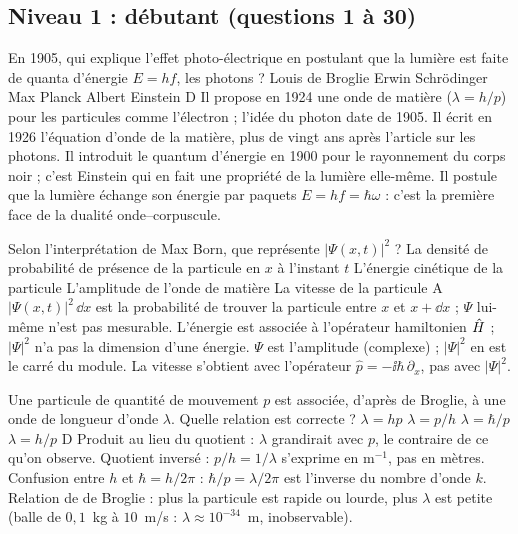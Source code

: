 \clearpage
\subsection{Niveau 1 : débutant (questions 1 à 30)}\label{sec:qcm-n1}
\par\smallskip
  {En 1905, qui explique l'effet photo-électrique en postulant que la lumière est faite de quanta d'énergie $E=hf$, les photons ?}
  {Louis de Broglie}
  {Erwin Schrödinger}
  {Max Planck}
  {Albert Einstein}
  {D}
\qcmx
  {Il propose en 1924 une onde de matière ($\lambda=h/p$) pour les particules comme l'électron ; l'idée du photon date de 1905.}
  {Il écrit en 1926 l'équation d'onde de la matière, plus de vingt ans après l'article sur les photons.}
  {Il introduit le quantum d'énergie en 1900 pour le rayonnement du corps noir ; c'est Einstein qui en fait une propriété de la lumière elle-même.}
  {Il postule que la lumière échange son énergie par paquets $E=hf=\hbar\omega$ : c'est la première face de la dualité onde--corpuscule.}

  {Selon l'interprétation de Max Born, que représente $|\Psi(x,t)|^2$ ?}
  {La densité de probabilité de présence de la particule en $x$ à l'instant $t$}
  {L'énergie cinétique de la particule}
  {L'amplitude de l'onde de matière}
  {La vitesse de la particule}
  {A}
\qcmx
  {$|\Psi(x,t)|^2\,\dd x$ est la probabilité de trouver la particule entre $x$ et $x+\dd x$ ; $\Psi$ lui-même n'est pas mesurable.}
  {L'énergie est associée à l'opérateur hamiltonien $\hat{H}$ ; $|\Psi|^2$ n'a pas la dimension d'une énergie.}
  {$\Psi$ est l'amplitude (complexe) ; $|\Psi|^2$ en est le carré du module.}
  {La vitesse s'obtient avec l'opérateur $\hat p=-\ii\hbar\,\partial_x$, pas avec $|\Psi|^2$.}

  {Une particule de quantité de mouvement $p$ est associée, d'après de Broglie, à une onde de longueur d'onde $\lambda$. Quelle relation est correcte ?}
  {$\lambda=hp$}
  {$\lambda=p/h$}
  {$\lambda=\hbar/p$}
  {$\lambda=h/p$}
  {D}
\qcmx
  {Produit au lieu du quotient : $\lambda$ grandirait avec $p$, le contraire de ce qu'on observe.}
  {Quotient inversé : $p/h=1/\lambda$ s'exprime en m$^{-1}$, pas en mètres.}
  {Confusion entre $h$ et $\hbar=h/2\pi$ : $\hbar/p=\lambda/2\pi$ est l'inverse du nombre d'onde $k$.}
  {Relation de de Broglie : plus la particule est rapide ou lourde, plus $\lambda$ est petite (balle de $0{,}1$~kg à $10$~m/s : $\lambda\approx10^{-34}$~m, inobservable).}

